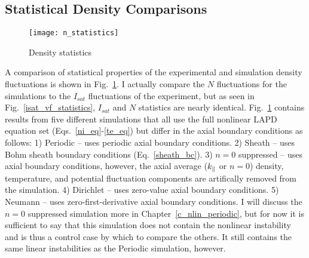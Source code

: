 \subsection{Statistical Density Comparisons}
\label{ss_stat_dens_comps}

\begin{figure}[!ht]
\centerline{\texttt{[image: n\_statistics]}}
\caption{Density statistics}
\label{n_statistics}
\end{figure}

A comparison of statistical properties of the experimental and simulation density fluctuations is shown in Fig.~\ref{n_statistics}. I actually compare the $N$ fluctuations for the simulations
to the $I_{sat}$ fluctuations of the experiment, but as seen in Fig.~\ref{isat_vf_statistics}, $I_{sat}$ and $N$ statistics are nearly identical.
Fig.~\ref{n_statistics} contains results from five different simulations
that all use the full nonlinear LAPD equation set (Eqs.~\ref{ni_eq}-\ref{te_eq}) but differ in the axial boundary conditions as follows:
1) Periodic -- uses periodic axial boundary conditions. 2) Sheath -- uses Bohm sheath boundary conditions (Eq.~\ref{sheath_bc}). 3) $n=0$ suppressed -- uses axial boundary conditions,
however, the axial average ($k_\parallel$ or $n = 0$) density, temperature, and potential fluctuation components are artifically removed from the simulation. 4) Dirichlet -- uses zero-value axial
boundary conditions. 5) Neumann -- uses zero-first-derivative axial boundary conditions. I will discuss the $n=0$ suppressed simulation more in Chapter~\ref{c_nlin_periodic}, but for
now it is sufficient to say that this simulation does not contain the nonlinear instability and is thus a control case by which to compare the others. It still contains the same
linear instabilities as the Periodic simulation, however.


